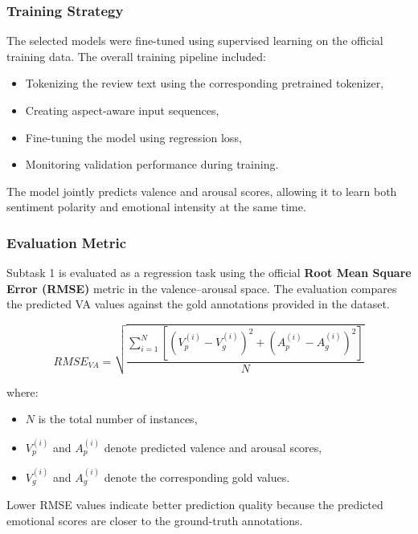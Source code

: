 \documentclass{article}
\begin{document}
\subsubsection{Training Strategy}

The selected models were fine-tuned using supervised learning on the official training data. The overall training pipeline included:

\begin{itemize}
    \item Tokenizing the review text using the corresponding pretrained tokenizer,
    \item Creating aspect-aware input sequences,
    \item Fine-tuning the model using regression loss,
    \item Monitoring validation performance during training.
\end{itemize}

The model jointly predicts valence and arousal scores, allowing it to learn both sentiment polarity and emotional intensity at the same time.

\subsubsection{Evaluation Metric}

Subtask 1 is evaluated as a regression task using the official \textbf{Root Mean Square Error (RMSE)} metric in the valence–arousal space. The evaluation compares the predicted VA values against the gold annotations provided in the dataset.

\begin{equation}
RMSE_{VA} =
\sqrt{
\frac{
\sum_{i=1}^{N}
\left[
\left(V_p^{(i)} - V_g^{(i)}\right)^2
+
\left(A_p^{(i)} - A_g^{(i)}\right)^2
\right]
}{N}
}
\end{equation}

where:
\begin{itemize}
    \item $N$ is the total number of instances,
    \item $V_p^{(i)}$ and $A_p^{(i)}$ denote predicted valence and arousal scores,
    \item $V_g^{(i)}$ and $A_g^{(i)}$ denote the corresponding gold values.
\end{itemize}

Lower RMSE values indicate better prediction quality because the predicted emotional scores are closer to the ground-truth annotations.
\end{document}
